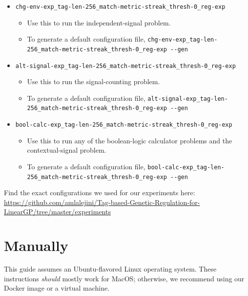 \documentclass[]{book}
\providecommand{\tightlist}{%
  \setlength{\itemsep}{0pt}\setlength{\parskip}{0pt}}
\begin{document}
\begin{itemize}
\tightlist
\item
  \texttt{chg-env-exp\_tag-len-256\_match-metric-streak\_thresh-0\_reg-exp}

  \begin{itemize}
  \tightlist
  \item
    Use this to run the independent-signal problem.
  \item
    To generate a default configuration file, \texttt{chg-env-exp\_tag-len-256\_match-metric-streak\_thresh-0\_reg-exp\ -\/-gen}
  \end{itemize}
\item
  \texttt{alt-signal-exp\_tag-len-256\_match-metric-streak\_thresh-0\_reg-exp}

  \begin{itemize}
  \tightlist
  \item
    Use this to run the signal-counting problem.
  \item
    To generate a default configuration file, \texttt{alt-signal-exp\_tag-len-256\_match-metric-streak\_thresh-0\_reg-exp\ -\/-gen}
  \end{itemize}
\item
  \texttt{bool-calc-exp\_tag-len-256\_match-metric-streak\_thresh-0\_reg-exp}

  \begin{itemize}
  \tightlist
  \item
    Use this to run any of the boolean-logic calculator problems and the contextual-signal problem.
  \item
    To generate a default configuration file, \texttt{bool-calc-exp\_tag-len-256\_match-metric-streak\_thresh-0\_reg-exp\ -\/-gen}
  \end{itemize}
\end{itemize}

Find the exact configurations we used for our experiments here: \url{https://github.com/amlalejini/Tag-based-Genetic-Regulation-for-LinearGP/tree/master/experiments}

\hypertarget{manually}{%
\section{Manually}\label{manually}}

This guide assumes an Ubuntu-flavored Linux operating system. These instructions \emph{should} mostly work for MacOS; otherwise, we recommend using our Docker image or a virtual machine.
\end{document}
